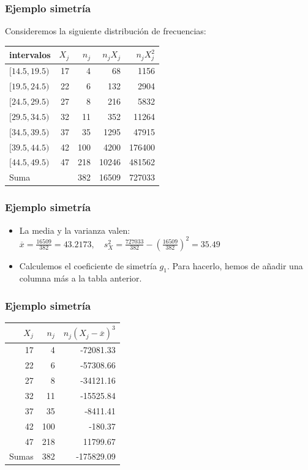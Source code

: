 \begin{frame}
\frametitle{Ejemplo simetría}
Consideremos la siguiente distribución de frecuencias: 

\begin{center}
\begin{tabular}{lrrrr}
intervalos  &  $X_j$ & $ n_j$ &  $n_jX_j$  &  $n_jX_j^2$ \\ \hline $[14.5,19.5)$ & 17  &
4    & 68   & 1156  \\ $[19.5,24.5)$ & 22  &  6   & 132   & 2904
\\ $[24.5,29.5)$ & 27  &  8  &  216   & 5832 \\ $[29.5,34.5)$ & 32  & 11  &  352   &
11264 \\ $[34.5,39.5)$ & 37  & 35  & 1295   & 47915 \\ $[39.5,44.5)$ & 42  &100  & 4200 &
176400 \\ $[44.5,49.5)$ & 47  & 218 & 10246 & 481562 \\ \hline
  Suma      & &   382 & 16509 & 727033
\end{tabular}
\end{center}
\end{frame}

\begin{frame}
\frametitle{Ejemplo simetría}
\begin{itemize}
\item La media y la varianza valen: $\overline{x}=  \frac{16509}{382}=43.2173, \quad s_{X}^2=
\frac{727033}{382}-\left(\frac{16509}{382}\right)^2=35.49$
\item Calculemos el  coeficiente de simetría $g_1$.  Para hacerlo, hemos de añadir una columna
más a la tabla anterior.
\end{itemize}
\end{frame}

\begin{frame}
\frametitle{Ejemplo simetría}
\begin{center}
\begin{tabular}{rrr}
        $X_j$ &  $ n_j$ &    $n_j {(X_j-\overline{x})}^3$ \\
\hline
        17 &   4  & -72081.33  \\
        22  &  6  & -57308.66 \\
        27  &  8  & -34121.16 \\
        32  & 11  & -15525.84 \\
        37  & 35  &  -8411.41 \\
        42  & 100  &  -180.37 \\
        47  & 218  & 11799.67 \\
\hline
 Sumas       & 382  &-175829.09
\end{tabular}
\end{center}
\end{frame}

